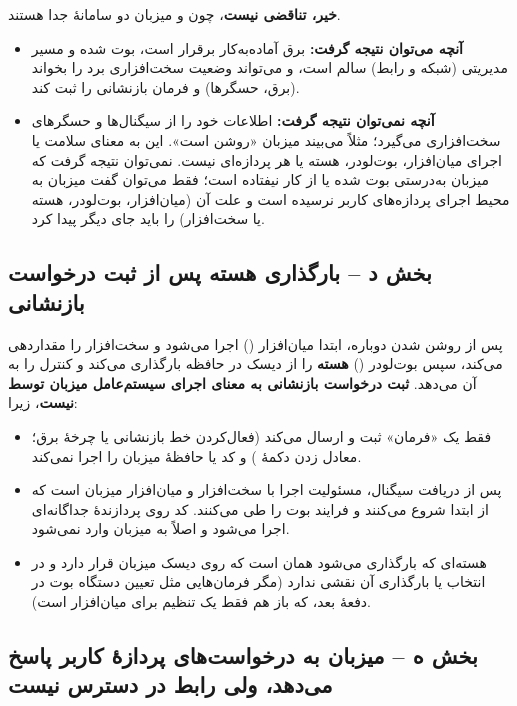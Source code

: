 \textbf{خیر، تناقضی نیست}، چون  و میزبان دو سامانهٔ جدا هستند.
\begin{itemize}
  \item \textbf{آنچه می‌توان نتیجه گرفت:} برق آماده‌به‌کار برقرار است،  بوت شده و مسیر مدیریتی (شبکه و رابط) سالم است، و  می‌تواند وضعیت سخت‌افزاری برد را بخواند (برق، حسگرها) و فرمان بازنشانی را ثبت کند.
  \item \textbf{آنچه نمی‌توان نتیجه گرفت:}  اطلاعات خود را از سیگنال‌ها و حسگرهای سخت‌افزاری می‌گیرد؛ مثلاً می‌بیند میزبان «روشن است». این به معنای سلامت یا اجرای میان‌افزار، بوت‌لودر، هسته یا هر پردازه‌ای نیست. نمی‌توان نتیجه گرفت که میزبان به‌درستی بوت شده یا از کار نیفتاده است؛ فقط می‌توان گفت میزبان به محیط اجرای پردازه‌های کاربر نرسیده است و علت آن (میان‌افزار، بوت‌لودر، هسته یا سخت‌افزار) را باید جای دیگر پیدا کرد.
\end{itemize}

\subsection*{بخش د – بارگذاری هسته پس از ثبت درخواست بازنشانی}

پس از روشن شدن دوباره، ابتدا میان‌افزار () اجرا می‌شود و سخت‌افزار را مقداردهی می‌کند، سپس بوت‌لودر () \textbf{هسته} را از دیسک در حافظه بارگذاری می‌کند و کنترل را به آن می‌دهد. \textbf{ثبت درخواست بازنشانی به معنای اجرای سیستم‌عامل میزبان توسط  نیست}، زیرا:
\begin{itemize}
  \item {} فقط یک «فرمان» ثبت و ارسال می‌کند (فعال‌کردن خط بازنشانی یا چرخهٔ برق؛ معادل زدن دکمهٔ ) و کد یا حافظهٔ میزبان را اجرا نمی‌کند.
  \item پس از دریافت سیگنال، مسئولیت اجرا با سخت‌افزار و میان‌افزار میزبان است که از ابتدا شروع می‌کنند و فرایند بوت را طی می‌کنند. کد  روی پردازندهٔ جداگانه‌ای اجرا می‌شود و اصلاً به میزبان وارد نمی‌شود.
  \item هسته‌ای که بارگذاری می‌شود همان است که روی دیسک میزبان قرار دارد و  در انتخاب یا بارگذاری آن نقشی ندارد (مگر فرمان‌هایی مثل تعیین دستگاه بوت در دفعهٔ بعد، که باز هم فقط یک تنظیم برای میان‌افزار است).
\end{itemize}

\subsection*{بخش ه – میزبان به درخواست‌های پردازهٔ کاربر پاسخ می‌دهد، ولی رابط  در دسترس نیست}

